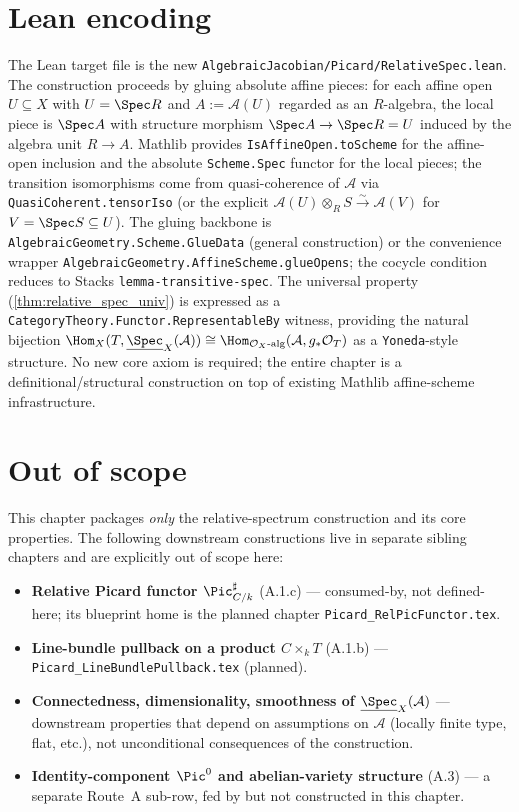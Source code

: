 \section{Lean encoding}
\label{sec:relspec_lean_encoding}

The Lean target file is the new \texttt{AlgebraicJacobian/Picard/RelativeSpec.lean}.
The construction proceeds by gluing absolute affine pieces: for each affine open
\(U \subseteq X\) with \(U = \Spec R\) and \(A := \mathcal{A}(U)\) regarded as an
\(R\)-algebra, the local piece is \(\Spec A\) with structure morphism \(\Spec A \to \Spec R = U\)
induced by the algebra unit \(R \to A\). Mathlib provides \texttt{IsAffineOpen.toScheme} for
the affine-open inclusion and the absolute \texttt{Scheme.Spec} functor for the local
pieces; the transition isomorphisms come from quasi-coherence of \(\mathcal{A}\) via
\texttt{QuasiCoherent.tensorIso} (or the explicit
\(\mathcal{A}(U) \otimes_R S \xrightarrow{\sim} \mathcal{A}(V)\) for \(V = \Spec S \subseteq U\)).
The gluing backbone is \texttt{AlgebraicGeometry.Scheme.GlueData} (general construction) or
the convenience wrapper \texttt{AlgebraicGeometry.AffineScheme.glueOpens}; the cocycle
condition reduces to Stacks \texttt{lemma-transitive-spec}. The universal property
(\cref{thm:relative_spec_univ}) is expressed as a
\texttt{CategoryTheory.Functor.RepresentableBy} witness, providing the natural bijection
$\Hom_X(T, \underline{\Spec}_X(\mathcal{A})) \cong
\Hom_{\mathcal{O}_X\text{-alg}}(\mathcal{A}, g_*\mathcal{O}_T)$ as a
\texttt{Yoneda}-style structure. No new core axiom is required; the entire chapter is a
definitional/structural construction on top of existing Mathlib affine-scheme
infrastructure.

\section{Out of scope}
\label{sec:relspec_out_of_scope}

This chapter packages \emph{only} the relative-spectrum construction and its core
properties. The following downstream constructions live in separate sibling chapters and
are explicitly out of scope here:
\begin{itemize}
  \item \textbf{Relative Picard functor \(\Pic^\sharp_{C/k}\)} (A.1.c) --- consumed-by, not
    defined-here; its blueprint home is the planned chapter
    \texttt{Picard\_RelPicFunctor.tex}.
  \item \textbf{Line-bundle pullback on a product \(C \times_k T\)} (A.1.b) ---
    \texttt{Picard\_LineBundlePullback.tex} (planned).
  \item \textbf{Connectedness, dimensionality, smoothness of \(\underline{\Spec}_X(\mathcal{A})\)}
    --- downstream properties that depend on assumptions on \(\mathcal{A}\)
    (locally finite type, flat, etc.), not unconditional consequences of the construction.
  \item \textbf{Identity-component \(\Pic^0\) and abelian-variety structure} (A.3) --- a
    separate Route~A sub-row, fed by but not constructed in this chapter.
\end{itemize}
